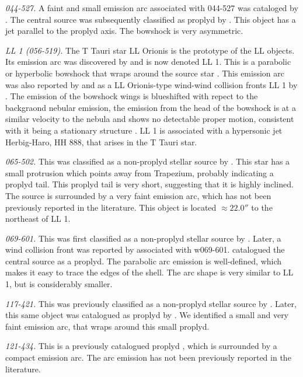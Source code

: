 \documentclass[iop, apj]{emulateapj}
\begin{document}
\textit{044-527.} A faint and small emission arc associated with 044-527 was cataloged by \citet{Bally:2000a}. The central source was subsequently classified as proplyd by \citet{Ricci:2008a}. This object has a jet parallel to the proplyd axis. The bowshock is very asymmetric.

\textit{LL 1 (056-519).} The T Tauri star LL Orionis is the prototype of the LL objects. Its emission arc was discovered by \citet{Gull:1979a} and is now denoted LL 1. This is a parabolic or hyperbolic bowshock that wraps around the source star \citep{Bally:2006a}. This emission arc was also reported by \citet{Bally:2000a} and as a LL Orionis-type wind-wind collision fronts LL 1 by \citet{Bally:2001a}. The emission of the bowshock wings is blueshifted with repect to the backgraond nebular emission, the emission from the head of the bowshock is at a similar velocity to the nebula and shows no detectable proper motion, consistent with it being a stationary structure \citep{Henney:2013a}. LL 1 is associated with a hypersonic jet Herbig-Haro, HH 888, that arises in the T Tauri star.

\textit{065-502.} This was classified as a  non-proplyd stellar source by \citet{ODell:1996a}. This star has a small protrusion which points away from Trapezium, probably indicating a proplyd tail. This proplyd tail is very short, suggesting that it is highly inclined. The source is surrounded by a very faint emission arc, which has not been previously reported in the literature. This object is located \(\approx 22.0''\) to the northeast of LL 1.    

\textit{069-601.} This was first classified as a non-proplyd stellar source by \citet{ODell:1996a}. Later, a wind collision front was reported  by \citet{Bally:2000a} associated with w069-601. \citet{Ricci:2008a} catalogued the central source as a proplyd. The parabolic arc emission is well-defined, which makes it easy to trace the edges of the shell. The arc shape is very similar to LL 1, but is considerably smaller. 

\textit{117-421.} This was previously classified as a non-proplyd stellar source by \citet{ODell:1996a}. Later, this same object was catalogued as proplyd by \citet{Ricci:2008a}. We identified a small and very faint emission arc, that wraps around this small proplyd. 

\textit{121-434.} This is  a previously catalogued proplyd \citep{Ricci:2008a}, which is surrounded by a compact emission arc. The arc emission has not been  previously reported in the literature.
\end{document}
